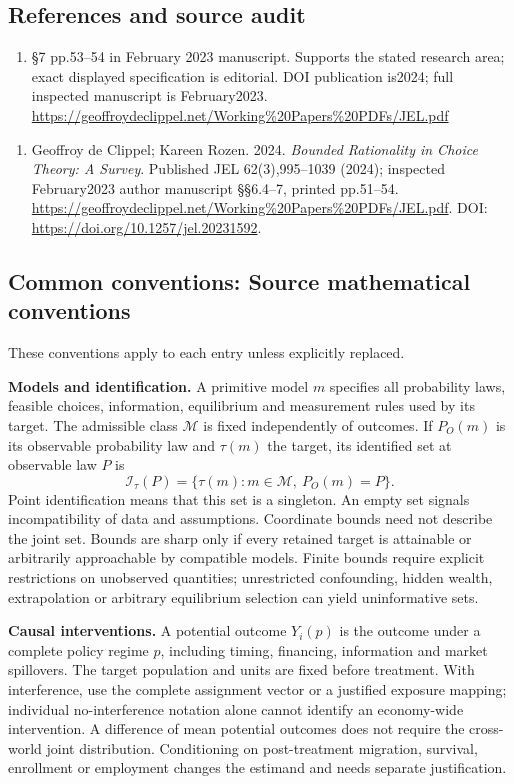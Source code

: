 \documentclass[11pt,a4paper]{article}
\begin{document}
\subsection*{References and source audit}
\begin{enumerate}
\item §7 pp.53–54 in February 2023 manuscript. Supports the stated research area; exact displayed specification is editorial. DOI publication is2024; full inspected manuscript is February2023. \url{https://geoffroydeclippel.net/Working%20Papers%20PDFs/JEL.pdf}
\end{enumerate}
\begin{enumerate}\raggedright
\item\hypertarget{definitions:source:30007555:1}{} Geoffroy de Clippel; Kareen Rozen. 2024. \emph{Bounded Rationality in Choice Theory: A Survey}. Published JEL 62(3),995–1039 (2024); inspected February2023 author manuscript §§6.4–7, printed pp.51–54.
\url{https://geoffroydeclippel.net/Working%20Papers%20PDFs/JEL.pdf}.
DOI: \url{https://doi.org/10.1257/jel.20231592}.
\end{enumerate}

\subsection*{Common conventions: Source mathematical conventions}

These conventions apply to each entry unless explicitly replaced.

\textbf{Models and identification.} A primitive model \(m\) specifies all probability laws, feasible choices, information, equilibrium and measurement rules used by its target. The admissible class \(\mathcal M\) is fixed independently of outcomes. If \(P_O(m)\) is its observable probability law and \(\tau(m)\) the target, its identified set at observable law \(P\) is
\[
 \mathcal I_\tau(P)=\{\tau(m):m\in\mathcal M,\ P_O(m)=P\}.
\]
Point identification means that this set is a singleton. An empty set signals incompatibility of data and assumptions. Coordinate bounds need not describe the joint set. Bounds are sharp only if every retained target is attainable or arbitrarily approachable by compatible models. Finite bounds require explicit restrictions on unobserved quantities; unrestricted confounding, hidden wealth, extrapolation or arbitrary equilibrium selection can yield uninformative sets.

\textbf{Causal interventions.} A potential outcome \(Y_i(p)\) is the outcome under a complete policy regime \(p\), including timing, financing, information and market spillovers. The target population and units are fixed before treatment. With interference, use the complete assignment vector or a justified exposure mapping; individual no-interference notation alone cannot identify an economy-wide intervention. A difference of mean potential outcomes does not require the cross-world joint distribution. Conditioning on post-treatment migration, survival, enrollment or employment changes the estimand and needs separate justification.
\end{document}
